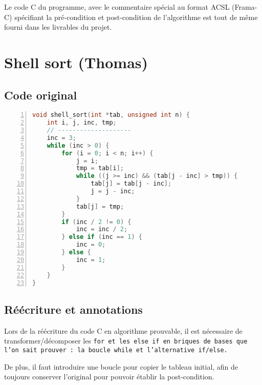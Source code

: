 \documentclass[a4paper, 11pt]{article}
\theoremstyle{mystyle}
\begin{document}
Le code C du programme, avec le commentaire spécial au format ACSL (Frama-C) spécifiant la pré-condition et post-condition de l'algorithme est tout de même fourni dans les livrables du projet.

\clearpage\section{Shell sort (Thomas)}

\subsection{Code original}

\begin{lstlisting}[language=c,  basicstyle=\ttfamily\normalsize\color{black!90},
  stringstyle=\color{black!70},
  commentstyle=\itshape\color{black!60},
  identifierstyle=\color{black!90},
  keywordstyle=\color{black!100}\bfseries,
  numberstyle=\ttfamily\small\color{black!50},
  numbers=left,
  numbersep=10pt,
  backgroundcolor=\color{black!1},
  rulecolor=\color{black!30},
  title=\large\ttfamily\lstname,
  breakatwhitespace=true,
  breaklines=false,
  captionpos=b,
  frame=single,
  keepspaces=true,
  showspaces=false,
  showstringspaces=false,
  showtabs=false,
  stepnumber=1,
  tabsize=4,
  numberblanklines=true,
  frameround=tttt,
  belowskip=-1.2\baselineskip,]
void shell_sort(int *tab, unsigned int n) {
    int i, j, inc, tmp;
    // --------------------
    inc = 3;
    while (inc > 0) {
        for (i = 0; i < n; i++) {
            j = i;
            tmp = tab[i];
            while ((j >= inc) && (tab[j - inc] > tmp)) {
                tab[j] = tab[j - inc];
                j = j - inc;
            }
            tab[j] = tmp;
        }
        if (inc / 2 != 0) {
            inc = inc / 2;
        } else if (inc == 1) {
            inc = 0;
        } else {
            inc = 1;
        }
    }
}
\end{lstlisting}

\subsection{Réécriture et annotations}

Lors de la réécriture du code C en algorithme prouvable, il est nécessaire de transformer/décomposer les \tt{for} et les \tt{else if} en briques de bases que l'on sait prouver : la boucle \tt{while} et l'alternative \tt{if}/\tt{else}.

De plus, il faut introduire une boucle pour copier le tableau initial, afin de toujours conserver l'original pour pouvoir établir la post-condition.
\end{document}
